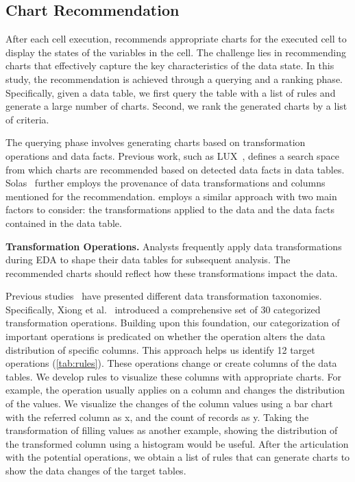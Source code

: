 \subsection{Chart Recommendation}

After each cell execution, \system{} recommends appropriate charts for the executed cell to display the states of the variables in the cell. 
The challenge lies in recommending charts that effectively capture the key characteristics of the data state. 
In this study, the recommendation is achieved through a querying and a ranking phase.
Specifically, given a data table, we first query the table with a list of rules and generate a large number of charts.
Second, we rank the generated charts by a list of criteria. 

The querying phase involves generating charts based on transformation operations and data facts.
Previous work, such as LUX~\cite{lee2021lux}, defines a search space from which charts are recommended based on detected data facts in data tables. 
Solas~\cite{epperson2022leveraging} further employs the provenance of data transformations and columns mentioned for the recommendation.
\system{} employs a similar approach with two main factors to consider: the transformations applied to the data and the data facts contained in the data table. 

\textbf{Transformation Operations.}
Analysts frequently apply data transformations during EDA to shape their data tables for subsequent analysis. The recommended charts should reflect how these transformations impact the data. 

Previous studies~\cite{tablescraps, comantics, proactive} have presented different data transformation taxonomies. 
Specifically, Xiong et al.~\cite{comantics} introduced a comprehensive set of 30 categorized transformation operations.
Building upon this foundation, our categorization of important operations is predicated on whether the operation alters the data distribution of specific columns. 
This approach helps us identify 12 target operations (\autoref{tab:rules}). 
These operations change or create columns of the data tables. 
We develop rules to visualize these columns with appropriate charts. 
For example, the  operation usually applies on a column and changes the distribution of the values.
We visualize the changes of the column values using a bar chart with the referred column as x, and the count of records as y. 
Taking the transformation of filling  values as another example, showing the distribution of the transformed column using a histogram would be useful.
After the articulation with the potential operations, we obtain a list of rules that can generate charts to show the data changes of the target tables. 

